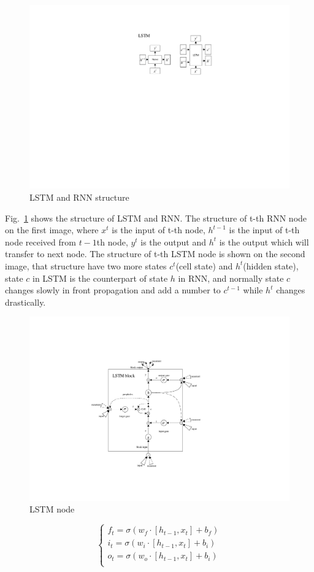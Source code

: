 \documentclass[conference, a4paper]{IEEEtran}
\begin{document}
    \begin{figure}[htbp]
      \centerline{\includegraphics[width=0.7\linewidth]{figures/LSTM_struc.pdf}}
      \caption{LSTM and RNN structure}
      \label{fig:LSTM}
    \end{figure}

    Fig.~\ref{fig:LSTM} shows the structure of LSTM and RNN. The structure of t-th RNN node on the first image, where $x^t$ is the input of t-th node, $h^{t-1}$ is the input of t-th node received from $t-1$th node, $y^t$ is the output and $h^t$ is the output which will transfer to next node. The structure of t-th LSTM node is shown on the second image, that structure have two more states $c^t$(cell state) and $h^t$(hidden state), state $c$ in LSTM is the counterpart of state $h$ in RNN, and normally state $c$ changes slowly in front propagation and add a number to $c^{t-1}$ while $h^t$ changes drastically.

    \begin{figure}[htbp]
      \centerline{\includegraphics[width=0.7\linewidth]{figures/LSTM_node.pdf}}
      \caption{LSTM node}
      \label{fig:LSTM2}
    \end{figure}

    \begin{equation}
      \begin{cases}	f_t=\sigma \left( w_f\cdot \left[ h_{t-1},x_t \right] +b_f \right)\\	i_t=\sigma \left( w_i\cdot \left[ h_{t-1},x_t \right] +b_i \right)\\	o_t=\sigma \left( w_o\cdot \left[ h_{t-1},x_t \right] +b_i \right)\\\end{cases}
      \label{eq:gate}
    \end{equation}
\end{document}

